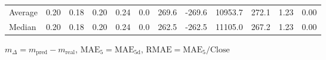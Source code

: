 \begin{threeparttable}
{\begin{tabular}{lrrrrrrrrrrr}
Average &          0.20 &          0.18 &          0.20 &        0.24 &                 0.0 &               269.6 &     -269.6 &             10953.7 &            272.1 &            1.23 &                   0.00 \\
 Median &          0.20 &          0.18 &          0.20 &        0.24 &                 0.0 &               262.5 &     -262.5 &             11105.0 &            267.2 &            1.23 &                   0.00 \\
\bottomrule
\end{tabular}
}
\begin{tablenotes}\footnotesize
\item $m_\Delta=m_{\text{pred}}-m_{\text{real}}$,
$\mathrm{MAE}_5=\mathrm{MAE}_{5\text{d}}$,
$\mathrm{RMAE}=\mathrm{MAE}_5/\text{Close}$
\end{tablenotes}
\end{threeparttable}
\endgroup

